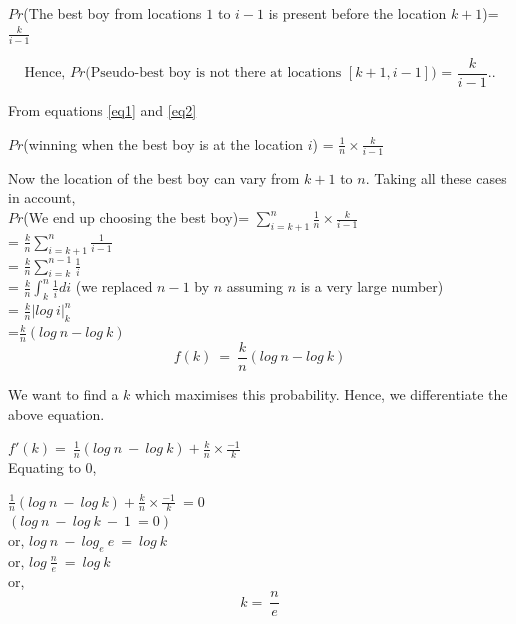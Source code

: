 \documentclass{book}
\begin{document}
\begin{center}
$Pr$(The best boy from locations $1$ to $i-1$ is present before the location $k+1$)= $\frac{k}{i-1}$
\end{center}


\begin{equation}\label{eq2}
\text{Hence, $Pr$(Pseudo-best boy is not there at locations $[k+1,i-1]$) = $\frac{k}{i-1}$..}
\end{equation}



From equations \ref{eq1} and \ref{eq2} \\
\begin{center}
$Pr$(winning when the best boy is at the location $i$) = $\frac{1}{n} \times \frac{k}{i-1}$\\
\end{center}

Now the location of the best boy can vary from $k+1$ to $n$. Taking all these cases in account,\\

$Pr$(We end up choosing the best boy)= $\sum_{i=k+1}^n \frac{1}{n} \times \frac{k}{i-1}$\\

= $\frac{k}{n} \sum_{i=k+1}^n \frac{1}{i-1}$\\

= $\frac{k}{n} \sum_{i=k}^{n-1} \frac{1}{i}$\\

= $\frac{k}{n} \int_{k}^{n} \frac{1}{i} di$ (we replaced $n-1$ by $n$ assuming $n$ is a very large number)\\

= $\frac{k}{n}|log\ i|_{k}^{n}$\\

=$\frac{k}{n} (log\ n - log\ k)$\\

\[
 \boxed{f(k)\ =\ \frac{k}{n} (log\ n - log\ k)}
 \]
 
 We want to find a $k$ which maximises this probability. Hence, we differentiate the above equation.
 
 $f'(k)=\ \frac{1}{n} (log\ n\ -\ log\ k) + \frac{k}{n} \times \frac{-1}{k}$\\
 
 Equating to $0$,
 
 $\frac{1}{n} (log\ n\ -\ log\ k) + \frac{k}{n} \times \frac{-1}{k}\ =0$\\
 
 $ (log\ n\ -\ log\ k\ -\ 1\ = 0)$\\
 
 or, $log\ n\ -\ log_e\ e\ =\ log\ k$\\
 
 or, $log\ \frac{n}{e}\ =\ log\ k$\\
 
 or, 
\[
 \boxed{k=\ \frac{n}{e}}
 \]





\end{document}
